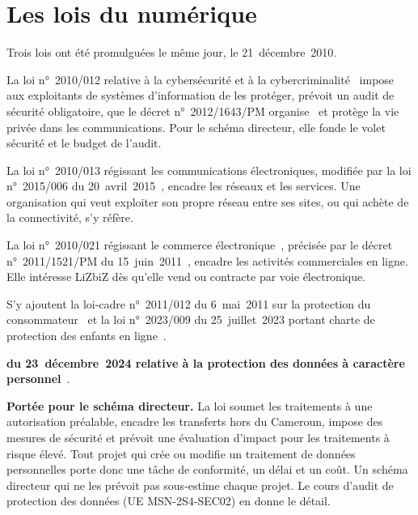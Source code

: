 \section{Les lois du numérique}
\label{sec:c07-numerique}

Trois lois ont été promulguées le même jour, le 21~décembre~2010.

La loi n°~2010/012 relative à la cybersécurité et à la cybercriminalité~\cite{loi2010012} impose aux exploitants
de systèmes d'information de les protéger, prévoit un audit de sécurité obligatoire, que le décret
n°~2012/1643/PM organise~\cite{decret20121643} et protège la vie privée dans les communications. Pour le schéma
directeur, elle fonde le volet sécurité et le budget de l'audit.

La loi n°~2010/013 régissant les communications électroniques, modifiée par la loi n°~2015/006 du
20~avril~2015~\cite{loi2010013}, encadre les réseaux et les services. Une organisation qui veut exploiter son
propre réseau entre ses sites, ou qui achète de la connectivité, s'y réfère.

La loi n°~2010/021 régissant le commerce électronique~\cite{loi2010021}, précisée par le décret n°~2011/1521/PM
du 15~juin~2011~\cite{decret20111521}, encadre les activités commerciales en ligne. Elle intéresse LiZbiZ dès
qu'elle vend ou contracte par voie électronique.

S'y ajoutent la loi-cadre n°~2011/012 du 6~mai~2011 sur la protection du consommateur~\cite{loi2011012} et la
loi n°~2023/009 du 25~juillet~2023 portant charte de protection des enfants en ligne~\cite{loi2023009}.

\begin{boxjuris}
\textbf{ du 23~décembre~2024 relative à la protection des données à caractère
personnel}~\cite{loi2024017}.

\smallskip
\textbf{Portée pour le schéma directeur.} La loi soumet les traitements à une autorisation préalable, encadre
les transferts hors du Cameroun, impose des mesures de sécurité et prévoit une évaluation d'impact pour les
traitements à risque élevé. Tout projet qui crée ou modifie un traitement de données personnelles porte donc
une tâche de conformité, un délai et un coût. Un schéma directeur qui ne les prévoit pas sous-estime chaque
projet. Le cours d'audit de protection des données (UE MSN-2S4-SEC02) en donne le détail.
\end{boxjuris}

